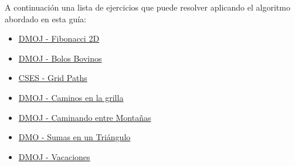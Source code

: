 A continuación una lista de ejercicios que puede resolver aplicando el algoritmo abordado en esta guía:

\begin{itemize}
	\item \href{https://dmoj.uclv.edu.cu/problem/fibonacci}{DMOJ - Fibonacci 2D}
	\item \href{https://dmoj.uclv.edu.cu/problem/bowl}{DMOJ - Bolos Bovinos}
	\item \href{https://cses.fi/problemset/task/1638}{CSES - Grid Paths}
	\item \href{https://dmoj.uclv.edu.cu/problem/grid}{DMOJ - Caminos en la grilla}
	\item \href{https://dmoj.uclv.edu.cu/problem/mountains}{DMOJ - Caminando entre Montañas}
	\item \href{https://dmoj.uclv.edu.cu/problem/sumsintriangle}{DMO - Sumas en un Triángulo}
	\item \href{https://dmoj.uclv.edu.cu/problem/vacations} {DMOJ - Vacaciones}
\end{itemize}